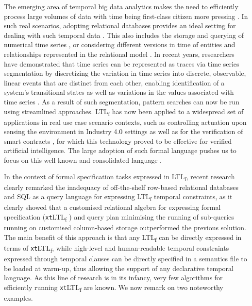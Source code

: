\documentclass[sigconf]{acmart}
\begin{document}
The emerging area of temporal big data analytics makes the need to efficiently process large volumes of data with time being first-class citizen more pressing \cite{cuzzocrea:LIPIcs.TIME.2021.4,DBLP:reference/db/Amer-YahiaPTKDC18}. In such real scenarios, adopting relational databases provides an ideal setting for dealing with such temporal data \cite{DBLP:conf/caise/SchonigRCJM16}. This also includes the storage and querying of numerical
time series \cite{DBLP:journals/pacmmod/HuangZCS23}, or considering different versions in time of entities and relationships represented in the relational
model \cite{5963680,DBLP:journals/pvldb/KaufmannVFKF13,DBLP:journals/isci/WangJS95,DBLP:conf/cikm/Wang95}. In recent years, researchers have demonstrated that time series can be represented as traces via time series segmentation by discretizing the variation in time series into discrete, observable, linear events that are distinct from each other, enabling identification of a system's transitional states \cite{DBLP:journals/pacmmod/00080ZC23} as well as variations in the values associated with time series \cite{HUO2022117176}. As a result of such segmentation, pattern searches can now be run using streamlined approaches. LTL\textsubscript{f} has now been applied to a widespread set of applications in real use case scenario contexts, such as controlling actuation upon sensing the environment in Industry 4.0 settings  \cite{9591387} as well as for the verification of smart contracts \cite{10.1007/978-3-031-08421-8_9}, for which this technology proved to be effective for verified artificial intelligence. The large adoption of such formal language  pushes us to focus on this well-known and consolidated language \cite{4567924,DBLP:conf/ijcai/GiacomoV13}.

In the context of formal specification tasks expressed in LTL\textsubscript{f}, recent research clearly remarked the inadequacy of off-the-shelf row-based relational databases and SQL as a query language for expressing LTL\textsubscript{f} temporal constraints, as it clearly showed that a customised relational algebra for expressing formal specification (\texttt{xt}LTL\textsubscript{f} \cite{info14030173}) and query plan minimising the running of sub-queries \cite{BellatrecheKB21} running on customised column-based storage outperformed the previous solution. The main benefit of this approach is that any LTL\textsubscript{f} can be directly expressed in terms of \texttt{xt}LTL\textsubscript{f}, while high-level and human-readable temporal constraints expressed through temporal clauses can be directly specified in a semantics file to be loaded at warm-up, thus allowing the support of any declarative temporal language. As this line of research is in its infancy, very few algorithms for efficiently running \texttt{xt}LTL\textsubscript{f} are known. We now remark on two noteworthy examples.
\end{document}
